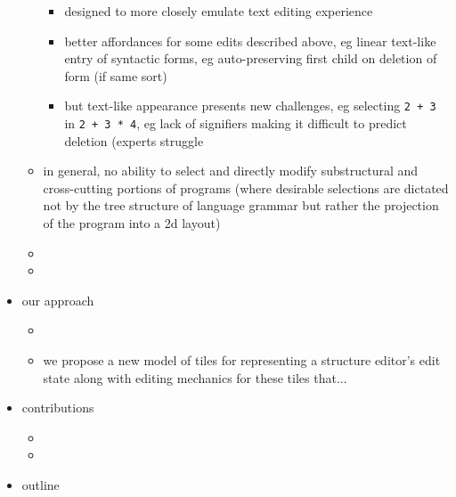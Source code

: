 \begin{itemize}
\begin{itemize}
  \begin{itemize}
    \item designed to more closely emulate text editing experience
    \item better affordances for some edits described above,
      eg linear text-like entry of syntactic forms,
      eg auto-preserving first child on deletion of form (if same sort)
    \item but text-like appearance presents new challenges,
      eg selecting \texttt{2 + 3} in \texttt{2 + 3 * 4},
      eg lack of signifiers making it difficult to predict deletion (experts struggle
  \end{itemize}
  \item in general, no ability to select and directly modify substructural
    and cross-cutting portions of programs (where desirable selections are
    dictated not by the tree structure of language grammar but rather the
    projection of the program into a 2d layout)
  \item {}
  \item {}
\end{itemize}
\item our approach
\begin{itemize}
    \item {}
    \item we propose a new model of tiles for representing a structure editor's edit state along with editing mechanics for these tiles that...
\end{itemize}
\item contributions
\begin{itemize}
  \item {}
  \item {}
\end{itemize}
\item outline
\end{itemize}

